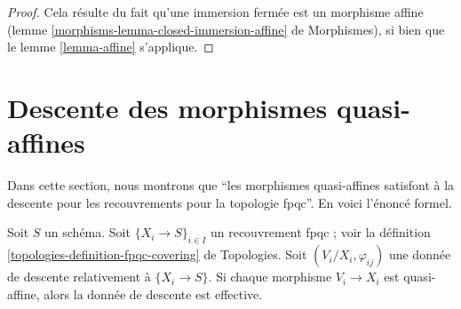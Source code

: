 \begin{proof}
Cela résulte du fait qu'une immersion fermée est un morphisme affine
(lemme \ref{morphisms-lemma-closed-immersion-affine} de Morphismes), si bien que
le lemme \ref{lemma-affine} s'applique.
\end{proof}


\section{Descente des morphismes quasi-affines}
\label{section-quasi-affine}

\noindent
Dans cette section, nous montrons que
``les morphismes quasi-affines satisfont à la descente pour les recouvrements
pour la topologie fpqc''. En voici l'énoncé formel.

\begin{lemma}
\label{lemma-quasi-affine}
Soit $S$ un schéma. Soit $\{X_i \to S\}_{i\in I}$ un recouvrement fpqc ; voir
la définition \ref{topologies-definition-fpqc-covering} de Topologies. Soit
$(V_i/X_i, \varphi_{ij})$ une donnée de descente relativement à
$\{X_i \to S\}$. Si chaque morphisme $V_i \to X_i$ est quasi-affine, alors la
donnée de descente est effective.
\end{lemma}

